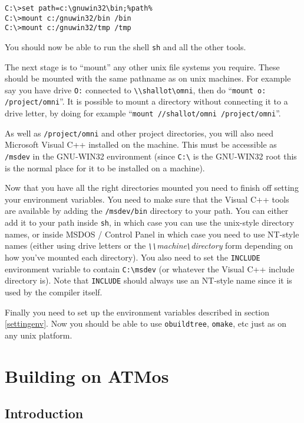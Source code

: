 \documentclass[11pt,twoside,onecolumn]{article}
\begin{document}
{\footnotesize \begin{verbatim}
C:\>set path=c:\gnuwin32\bin;%path%
C:\>mount c:/gnuwin32/bin /bin
C:\>mount c:/gnuwin32/tmp /tmp
\end{verbatim}}

You should now be able to run the shell {\tt sh} and all the other tools.

The next stage is to ``mount'' any other unix file systems you require.  These
should be mounted with the same pathname as on unix machines.  For example say
you have drive \verb|O:| connected to \verb|\\shallot\omni|, then do
``\verb|mount o: /project/omni|''.  It is possible to mount a directory without
connecting it to a drive letter, by doing for example
``\verb|mount //shallot/omni /project/omni|''.

As well as \verb|/project/omni| and other project directories, you will also
need Microsoft Visual C++ installed on the machine.  This must be accessible as
\verb|/msdev| in the GNU-WIN32 environment (since \verb|C:\| is the GNU-WIN32
root this is the normal place for it to be installed on a machine).

Now that you have all the right directories mounted you need to finish off
setting your environment variables.  You need to make sure that the Visual C++
tools are available by adding the \verb|/msdev/bin| directory to your path.
You can either add it to your path inside {\tt sh}, in which case you can use
the unix-style directory names, or inside MSDOS / Control Panel in which case
you need to use NT-style names (either using drive letters or the {\it
\verb|\\|machine\verb|\|directory} form depending on how you've mounted each
directory).  You also need to set the {\tt INCLUDE} environment variable to
contain \verb|C:\msdev| (or whatever the Visual C++ include directory
is).  Note that {\tt INCLUDE} should always use an NT-style name since it is
used by the compiler itself.

Finally you need to set up the environment variables described in section
\ref{settingenv}.  Now you should be able to use {\tt obuildtree}, {\tt omake},
etc just as on any unix platform.

\section{Building on ATMos}

\subsection{Introduction}
\end{document}
